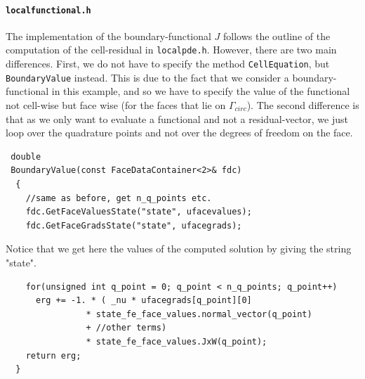 \documentclass[prodmode,acmtoms]{acmsmall}
\numberwithin{equation}{section}
\begin{document}
\paragraph{\texttt{localfunctional.h}}
The implementation of the boundary-functional $J$ follows the outline of the computation of the cell-residual in \texttt{localpde.h}. However, there are two main differences. First, we do not have to specify the method \texttt{CellEquation}, but \texttt{BoundaryValue} instead. This is due to the fact that we consider a boundary-functional in this example, and so we have to specify the value of the functional not cell-wise but face wise (for the faces that lie on $\Gamma_{circ}$). The second difference is that as we only want to evaluate a functional and not a residual-vector, we just loop over the quadrature points and not over the degrees of freedom on the face.
\begin{lstlisting}
 double
 BoundaryValue(const FaceDataContainer<2>& fdc)
  {
    //same as before, get n_q_points etc.
    fdc.GetFaceValuesState("state", ufacevalues);
    fdc.GetFaceGradsState("state", ufacegrads);
\end{lstlisting}
Notice that we get here the values of the computed solution by giving the string "state".
\begin{lstlisting}
    for(unsigned int q_point = 0; q_point < n_q_points; q_point++)
      erg += -1. * ( _nu * ufacegrads[q_point][0]
                * state_fe_face_values.normal_vector(q_point)
                + //other terms)        
                * state_fe_face_values.JxW(q_point);
    return erg;
  }
\end{lstlisting}
\end{document}
